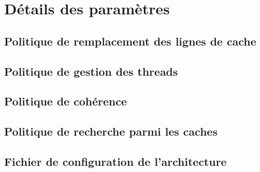 
\section{Détails des paramètres}

\subsection{Politique de remplacement des lignes de cache}

\subsection{Politique de gestion des threads}

\subsection{Politique de cohérence}

\subsection{Politique de recherche parmi les caches}

\subsection{Fichier de configuration de l'architecture}
